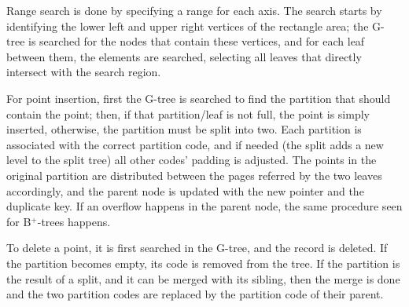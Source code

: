 Range search is done by specifying a range for each axis. The search starts by identifying the lower left and upper right vertices of the rectangle area; the G-tree is searched for the nodes that contain these vertices, and for each leaf between them, the elements are searched, selecting all leaves that directly intersect with the search region.

For point insertion, first the G-tree is searched to find the partition that should contain the point; then, if that partition/leaf is not full, the point is simply inserted, otherwise, the partition must be split into two. Each partition is associated with the correct partition code, and if needed (the split adds a new level to the split tree) all other codes' padding is adjusted. The points in the original partition are distributed between the pages referred by the two leaves accordingly, and the parent node is updated with the new pointer and the duplicate key. If an overflow happens in the parent node, the same procedure seen for B$^+$-trees happens.

To delete a point, it is first searched in the G-tree, and the record is deleted. If the partition becomes empty, its code is removed from the tree. If the partition is the result of a split, and it can be merged with its sibling, then the merge is done and the two partition codes are replaced by the partition code of their parent.